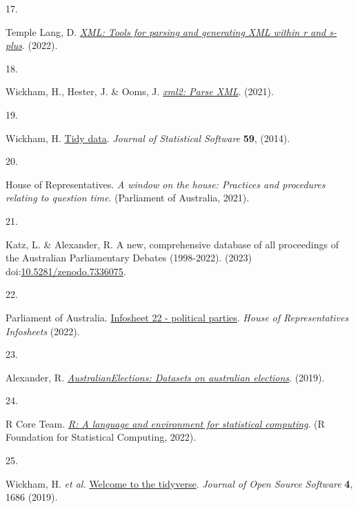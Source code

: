 \documentclass[
  letterpaper,
  DIV=11,
  numbers=noendperiod]{scrartcl}
\newlength{\cslhangindent}
\newlength{\csllabelwidth}
\newlength{\cslentryspacingunit} %
\newenvironment{CSLReferences}[2] %
 {%
  \setlength{\parindent}{0pt}
  \ifodd #1
  \let\oldpar\par
  \def\par{\hangindent=\cslhangindent\oldpar}
  \fi
  \setlength{\parskip}{#2\cslentryspacingunit}
 }%
 {}
\newcommand{\CSLLeftMargin}[1]{\parbox[t]{\csllabelwidth}{#1}}
\newcommand{\CSLRightInline}[1]{\parbox[t]{\linewidth - \csllabelwidth}{#1}\break}
\begin{document}
\begin{CSLReferences}{0}{0}
\leavevmode{}%
\CSLLeftMargin{17. }%
\CSLRightInline{Temple Lang, D.
\emph{\href{https://CRAN.R-project.org/package=XML}{XML: Tools for
parsing and generating XML within r and s-plus}}. (2022).}

\leavevmode{}%
\CSLLeftMargin{18. }%
\CSLRightInline{Wickham, H., Hester, J. \& Ooms, J.
\emph{\href{https://CRAN.R-project.org/package=xml2}{xml2: Parse XML}}.
(2021).}

\leavevmode{}%
\CSLLeftMargin{19. }%
\CSLRightInline{Wickham, H.
\href{https://doi.org/10.18637/jss.v059.i10}{Tidy data}. \emph{Journal
of Statistical Software} \textbf{59}, (2014).}

\leavevmode{}%
\CSLLeftMargin{20. }%
\CSLRightInline{House of Representatives. \emph{{A window on the house:
Practices and procedures relating to question time}}. ({Parliament of
Australia}, 2021).}

\leavevmode{}%
\CSLLeftMargin{21. }%
\CSLRightInline{Katz, L. \& Alexander, R. {A new, comprehensive database
of all proceedings of the Australian Parliamentary Debates (1998-2022)}.
(2023)
doi:\href{https://doi.org/10.5281/zenodo.7336075}{10.5281/zenodo.7336075}.}

\leavevmode{}%
\CSLLeftMargin{22. }%
\CSLRightInline{Parliament of Australia.
\href{https://www.aph.gov.au/About_Parliament/House_of_Representatives/Powers_practice_and_procedure/00_-_Infosheets/Infosheet_22_-_Political_parties}{Infosheet
22 - political parties}. \emph{House of Representatives Infosheets}
(2022).}

\leavevmode{}%
\CSLLeftMargin{23. }%
\CSLRightInline{Alexander, R.
\emph{\href{https://github.com/RohanAlexander/AustralianElections}{AustralianElections:
Datasets on australian elections}}. (2019).}

\leavevmode{}%
\CSLLeftMargin{24. }%
\CSLRightInline{R Core Team. \emph{\href{https://www.R-project.org/}{R:
A language and environment for statistical computing}}. (R Foundation
for Statistical Computing, 2022).}

\leavevmode{}%
\CSLLeftMargin{25. }%
\CSLRightInline{Wickham, H. \emph{et al.}
\href{https://doi.org/10.21105/joss.01686}{Welcome to the {tidyverse}}.
\emph{Journal of Open Source Software} \textbf{4}, 1686 (2019).}

\end{CSLReferences}
\end{document}
